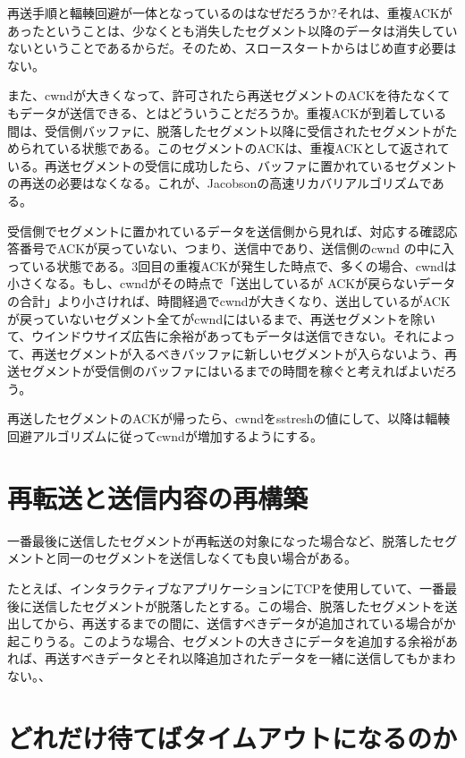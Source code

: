 再送手順と輻輳回避が一体となっているのはなぜだろうか?それは、重複ACKがあったということは、少なくとも消失したセグメント以降のデータは消失していないということであるからだ。そのため、スロースタートからはじめ直す必要はない。

また、cwndが大きくなって、許可されたら再送セグメントのACKを待たなくてもデータが送信できる、とはどういうことだろうか。重複ACKが到着している間は、受信側バッファに、脱落したセグメント以降に受信されたセグメントがためられている状態である。このセグメントのACKは、重複ACKとして返されている。再送セグメントの受信に成功したら、バッファに置かれているセグメントの再送の必要はなくなる。これが、Jacobsonの高速リカバリアルゴリズムである。

受信側でセグメントに置かれているデータを送信側から見れば、対応する確認応答番号でACKが戻っていない、つまり、送信中であり、送信側のcwnd の中に入っている状態である。3回目の重複ACKが発生した時点で、多くの場合、cwndは小さくなる。もし、cwndがその時点で「送出しているが ACKが戻らないデータの合計」より小さければ、時間経過でcwndが大きくなり、送出しているがACKが戻っていないセグメント全てがcwndにはいるまで、再送セグメントを除いて、ウインドウサイズ広告に余裕があってもデータは送信できない。それによって、再送セグメントが入るべきバッファに新しいセグメントが入らないよう、再送セグメントが受信側のバッファにはいるまでの時間を稼ぐと考えればよいだろう。

再送したセグメントのACKが帰ったら、cwndをsstreshの値にして、以降は輻輳回避アルゴリズムに従ってcwndが増加するようにする。

\section{再転送と送信内容の再構築}

一番最後に送信したセグメントが再転送の対象になった場合など、脱落したセグメントと同一のセグメントを送信しなくても良い場合がある。

たとえば、インタラクティブなアプリケーションにTCPを使用していて、一番最後に送信したセグメントが脱落したとする。この場合、脱落したセグメントを送出してから、再送するまでの間に、送信すべきデータが追加されている場合がか起こりうる。このような場合、セグメントの大きさにデータを追加する余裕があれば、再送すべきデータとそれ以降追加されたデータを一緒に送信してもかまわない。、

\section{どれだけ待てばタイムアウトになるのか}

